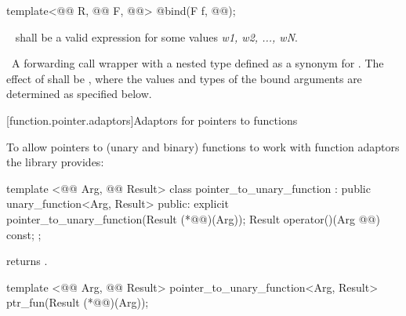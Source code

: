 \documentclass[american,twoside]{book}
\begin{document}
\begin{itemdecl}
template<@@ R, @@ F, @@> 
  @\unspec@ bind(F f, @@);
\end{itemdecl}

\begin{itemdescr}
\pnum\requires\ 
 shall be  a valid
expression for some
values \textit{w1, w2, ..., wN}.

\pnum\returns\ A forwarding call wrapper  with a nested  type
 defined as a synonym for .  The effect of
 shall be , where the values and types of the bound
arguments  are determined as specified below. 
\end{itemdescr}

[function.pointer.adaptors]{Adaptors for pointers to functions}

\pnum
To allow pointers to (unary and binary) functions to work with function adaptors
the library provides:

%
\begin{itemdecl}
template <@@ Arg, @@ Result>
class pointer_to_unary_function : public unary_function<Arg, Result> {
public:
  explicit pointer_to_unary_function(Result (*@@)(Arg));
  Result operator()(Arg @@) const;
};
\end{itemdecl}

\begin{itemdescr}
\pnum
{} returns .
\end{itemdescr}

%
\begin{itemdecl}
template <@@ Arg, @@ Result>
  pointer_to_unary_function<Arg, Result> ptr_fun(Result (*@@)(Arg));
\end{itemdecl}
\end{document}

